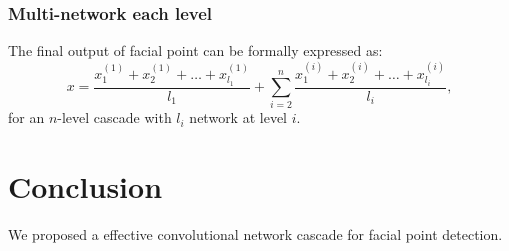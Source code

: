 \subsubsection{Multi-network each level}
The final output of facial point can be formally expressed as:
\[
	x = \frac{x_1^{(1)} + x_2^{(1)} + \dots + x_{l_1}^{(1)}}{l_1}
		+ \sum_{i=2}^{n}
		\frac{x_1^{(i)} + x_2^{(i)} + \dots + x_{l_i}^{(i)}}{l_i}
	,
\]
for an $n$-level cascade with $l_i$ network at level $i$.

\section{Conclusion}
We proposed a effective convolutional network cascade for facial point detection.


